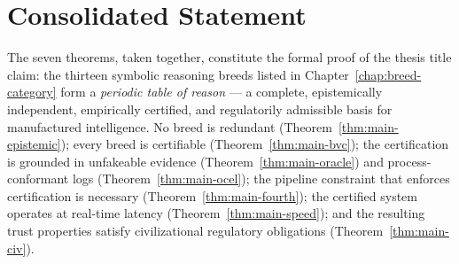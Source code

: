 \section{Consolidated Statement}
\label{sec:consolidated}

The seven theorems, taken together, constitute the formal proof of the thesis title claim:
the thirteen symbolic reasoning breeds listed in Chapter~\ref{chap:breed-category} form a
\emph{periodic table of reason} — a complete, epistemically independent, empirically
certified, and regulatorily admissible basis for manufactured intelligence. No breed is
redundant (Theorem~\ref{thm:main-epistemic}); every breed is certifiable
(Theorem~\ref{thm:main-bvc}); the certification is grounded in unfakeable evidence
(Theorem~\ref{thm:main-oracle}) and process-conformant logs
(Theorem~\ref{thm:main-ocel}); the pipeline constraint that enforces certification is
necessary (Theorem~\ref{thm:main-fourth}); the certified system operates at real-time
latency (Theorem~\ref{thm:main-speed}); and the resulting trust properties satisfy
civilizational regulatory obligations (Theorem~\ref{thm:main-civ}).
